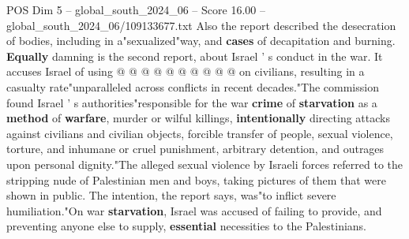 \begin{textsample}{POS Dim 5 – global\_south\_2024\_06 – Score 16.00 – global\_south\_2024\_06/109133677.txt}
Also the report described the desecration of bodies, including in a"sexualized"way, and \textbf{cases} of decapitation and burning. \textbf{Equally} damning is the second report, about Israel ' s conduct in the war.
It accuses Israel of using @ @ @ @ @ @ @ @ @ @ on civilians, resulting in a casualty rate"unparalleled across conflicts in recent decades."The commission found Israel ' s authorities"responsible for the war \textbf{crime} of \textbf{starvation} as a \textbf{method} of \textbf{warfare}, murder or wilful killings, \textbf{intentionally} directing attacks against civilians and civilian objects, forcible transfer of people, sexual violence, torture, and inhumane or cruel punishment, arbitrary detention, and outrages upon personal dignity."The alleged sexual violence by Israeli forces referred to the stripping nude of Palestinian men and boys, taking pictures of them that were shown in public.
The intention, the report says, was"to inflict severe humiliation."On war \textbf{starvation}, Israel was accused of failing to provide, and preventing anyone else to supply, \textbf{essential} necessities to the Palestinians.

\end{textsample}
